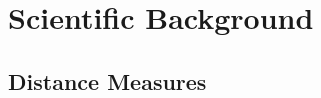 {%

%


%
\section{Scientific Background}
\label{sec:background_scientific_background}

\subsection{Distance Measures}
}
